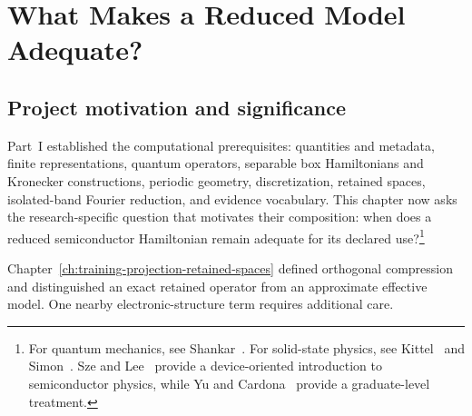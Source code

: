 \chapter{What Makes a Reduced Model Adequate?}

\label{ch:operator-reduction-motivation}


\section{Project motivation and significance}

Part~I established the computational prerequisites: quantities and metadata,
finite representations, quantum operators, separable box Hamiltonians and
Kronecker constructions, periodic geometry, discretization, retained spaces,
isolated-band Fourier reduction, and evidence vocabulary. This chapter now asks the
research-specific question that motivates their composition: when does a
reduced semiconductor Hamiltonian remain adequate for its declared use?\footnote{For quantum mechanics, see
Shankar~\cite{shankar1994}. For solid-state physics, see
Kittel~\cite{kittel2004} and Simon~\cite{simon2013}. Sze and
Lee~\cite{szeLee2012} provide a device-oriented introduction to semiconductor
physics, while Yu and Cardona~\cite{yuCardona2010} provide a graduate-level
treatment.}




Chapter~\ref{ch:training-projection-retained-spaces} defined orthogonal
compression and distinguished an exact retained operator from an approximate
effective model. One nearby electronic-structure term requires additional care.

